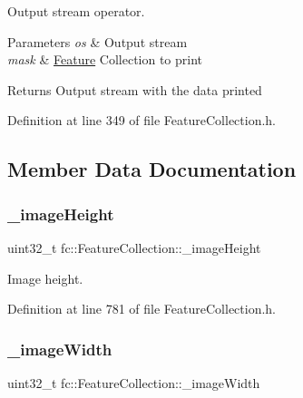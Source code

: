 Output stream operator. 


\begin{DoxyParams}{Parameters}
{\em os} & Output stream \\
\hline
{\em mask} & \hyperlink{classfc_1_1Feature}{Feature} Collection to print \\
\hline
\end{DoxyParams}
\begin{DoxyReturn}{Returns}
Output stream with the data printed 
\end{DoxyReturn}


Definition at line 349 of file Feature\+Collection.\+h.



\subsection{Member Data Documentation}
\mbox{\label{classfc_1_1FeatureCollection_a2a4c8fce1036912295801e197dc15b3d}} 
\subsubsection{\texorpdfstring{\+\_\+image\+Height}{\_imageHeight}}
{\footnotesize\ttfamily uint32\+\_\+t fc\+::\+Feature\+Collection\+::\+\_\+image\+Height\hspace{0.3cm}{\ttfamily [private]}}



Image height. 



Definition at line 781 of file Feature\+Collection.\+h.

\mbox{\label{classfc_1_1FeatureCollection_abe7c56d374e649deeedf9cbf682d110c}} 
\subsubsection{\texorpdfstring{\+\_\+image\+Width}{\_imageWidth}}
{\footnotesize\ttfamily uint32\+\_\+t fc\+::\+Feature\+Collection\+::\+\_\+image\+Width\hspace{0.3cm}{\ttfamily [private]}}



